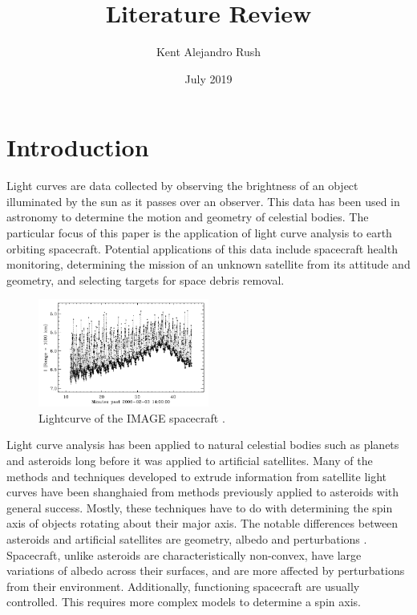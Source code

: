 \documentclass{article}
\title{Literature Review}
\author{Kent Alejandro Rush }
\date{July 2019}
\begin{document}
\maketitle

\section{Introduction}

Light curves are data collected by observing the brightness of an object illuminated by the sun as it passes over an observer. This data has been used in astronomy to determine the motion and geometry of celestial bodies. The particular focus of this paper is the application of light curve analysis to earth orbiting spacecraft. Potential applications of this data include spacecraft health monitoring, determining the mission of an unknown satellite from its attitude and geometry, and selecting targets for space debris removal.

\begin{figure}[h]
	\centering
	\includegraphics[width=0.5\textwidth]{lightcurve_AMOS}
	\caption{Lightcurve of the IMAGE spacecraft \cite{AMOS}.}
\end{figure}

Light curve analysis has been applied to natural celestial bodies such as planets and asteroids long before it was applied to artificial satellites. Many of the methods and techniques developed to extrude information from satellite light curves have been shanghaied from methods previously applied to asteroids with general success. Mostly, these techniques have to do with determining the spin axis of objects rotating about their major axis. The notable differences between asteroids and artificial satellites are geometry, albedo and perturbations \cite{Separating}. Spacecraft, unlike asteroids are characteristically non-convex, have large variations of albedo across their surfaces, and are more affected by perturbations from their environment. Additionally, functioning spacecraft are usually controlled. This requires more complex models to determine a spin axis.
\end{document}
